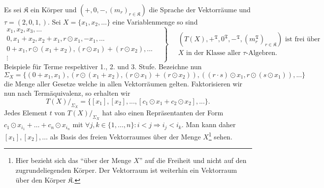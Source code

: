 \begin{example}
    Es sei $\mathfrak{K}$ ein Körper und $(+,0,-,(m_r)_{r\in\mathfrak{K}})$ die Sprache der Vektorräume und $\tau=(2,0,1,)$. Sei
    $X=\{x_1,x_2,\ldots\}$ eine Variablenmenge so sind
    $$ \left. \begin{matrix} x_1, x_2, x_3, ... \\ 0, x_1 + x_2, x_2 + x_1, r\odot x_1, -x_1, ... \\ 0 + x_1, r\odot (x_1+x_2), (r\odot x_1) + (r\odot x_2), ... \\ \vdots \end{matrix} \quad \right\} \quad \begin{matrix} (T(X), +^\mathfrak{T}, 0^\mathfrak{T}, -^\mathfrak{T},(m^\mathfrak{T}_r)_{r\in\mathfrak{K}}) \textrm{ ist frei über} \\ X \textrm{ in der Klasse aller $\tau$-Algebren.} \end{matrix} $$
    Beispiele für Terme respektiver 1., 2. und 3. Stufe. Bezeichne nun
    $$ \Sigma_X = \{ (0 + x_1, x_1), (r \odot (x_1+x_2), (r\odot x_1)+(r\odot x_2)), ((r\cdot s)\odot x_1, r\odot(s\odot x_1)), ... \} $$
    die Menge aller Gesetze welche in allen Vektorräumen gelten. Faktorisieren wir nun nach Term\-äquivalenz, so erhalten wir
    $$ T(X) /_{\Sigma_X} = \{ [x_1], [x_2], ..., [c_1\odot x_1 + c_2\odot x_2],... \}. $$
    Jedes Element $t$ von $T(X) /_{\Sigma_X}$ hat also einen Repräsentanten der Form $c_1\odot x_{i_1}+\ldots +c_n\odot x_{i_n}$ mit $\forall j,k\in\{1,\ldots,n\}:i<j\Rightarrow i_j<i_k$.
    Man kann daher $[x_1],[x_2],\ldots$ als Basis des freien Vektorraumes über der Menge $X$\footnote{Hier bezieht sich das ``über der Menge $X$'' auf die Freiheit und nicht auf den zugrundeliegenden Körper. Der Vektorraum ist weiterhin ein Vektorraum über den Körper $\mathfrak{K}$.} sehen.
\end{example}
